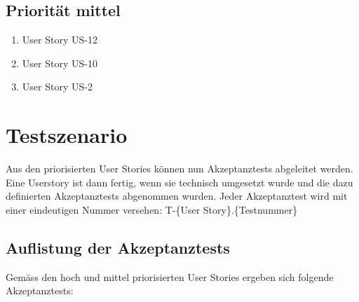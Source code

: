 \documentclass[abstracton, listof=totocnumbered,
bibliography=totocnumbered]{scrreprt}
\begin{document}
  \subsection{Priorität mittel}
  
  \begin{enumerate}
    \setcounter{enumi}{\value{userStoriesZaehler}}
    \item User Story US-12
    \item User Story US-10
    \item User Story US-2
  \end{enumerate}
  
  \newpage
  
  \section{Testszenario}
  
  Aus den priorisierten User Stories können nun Akzeptanztests abgeleitet
  werden. Eine Userstory ist dann fertig, wenn sie technisch umgesetzt wurde und
  die dazu definierten Akzeptanztests abgenommen wurden. Jeder Akzeptanztest
  wird mit einer eindeutigen Nummer versehen: T-\{User Story\}.\{Testnummer\}
    
  \subsection{Auflistung der Akzeptanztests}
  
  Gemäss den hoch und mittel priorisierten User Stories ergeben sich folgende
  Akzeptanztests:
    
\end{document}
